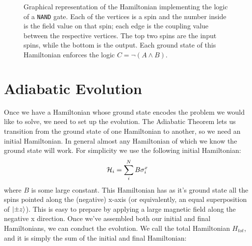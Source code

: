 \begin{figure}
	\begin{center}
\end{center}
	\caption[\texttt{NAND} Graph]{Graphical representation of the Hamiltonian implementing the logic of a \texttt{NAND} gate.  Each of the vertices is a spin and the number inside is the field value on that spin; each edge is the coupling value between the respective vertices.  The top two spins are the input spins, while the bottom is the output.  Each ground state of this Hamiltonian enforces the logic $C = \neg(A \wedge B)$.}
	\label{fig:nand_graph}
\end{figure}



\section{Adiabatic Evolution}
Once we have a Hamiltonian whose ground state encodes the problem we would like to solve, we need to set up the evolution.  The Adiabatic Theorem lets us transition from the ground state of one Hamiltonian to another, so we need an initial Hamiltonian.  In general almost any Hamiltonian of which we know the ground state will work.  For simplicity we use the following initial Hamiltonian:
\begin{equation}
	\mathcal{H}_i = \sum_i^N B \sigma_i^x
\end{equation}
where $B$ is some large constant.  This Hamiltonian has as it's ground state all the spins pointed along the (negative) x-axis (or equivalently, an equal superposition of $\mathinner{|{\pm z}\rangle}$).  This is easy to prepare by applying a large magnetic field along the negative x direction.
Once we've assembled both our initial and final Hamiltonians, we can conduct the evolution.  We call the total Hamiltonian $H_{tot}$, and it is simply the sum of the initial and final Hamiltonian:


